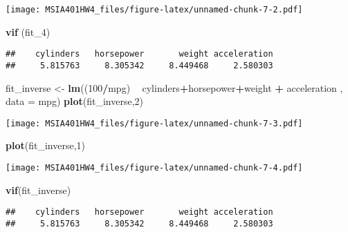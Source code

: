 \documentclass[
]{article}
\newenvironment{Shaded}{\begin{snugshade}}{\end{snugshade}}
\newcommand{\DataTypeTok}[1]{\textcolor[rgb]{0.13,0.29,0.53}{#1}}
\newcommand{\DecValTok}[1]{\textcolor[rgb]{0.00,0.00,0.81}{#1}}
\newcommand{\KeywordTok}[1]{\textcolor[rgb]{0.13,0.29,0.53}{\textbf{#1}}}
\newcommand{\NormalTok}[1]{#1}
\newcommand{\OperatorTok}[1]{\textcolor[rgb]{0.81,0.36,0.00}{\textbf{#1}}}
\newcommand{\StringTok}[1]{\textcolor[rgb]{0.31,0.60,0.02}{#1}}
\begin{document}
\texttt{[image: MSIA401HW4\_files/figure-latex/unnamed-chunk-7-2.pdf]}

\begin{Shaded}
\begin{Highlighting}[]
\KeywordTok{vif}\NormalTok{ (fit_}\DecValTok{4}\NormalTok{)}
\end{Highlighting}
\end{Shaded}

\begin{verbatim}
##    cylinders   horsepower       weight acceleration 
##     5.815763     8.305342     8.449468     2.580303
\end{verbatim}

\begin{Shaded}
\begin{Highlighting}[]
\NormalTok{fit_inverse <-}\StringTok{ }\KeywordTok{lm}\NormalTok{((}\DecValTok{100}\OperatorTok{/}\NormalTok{mpg) }\OperatorTok{~}\StringTok{ }\NormalTok{cylinders}\OperatorTok{+}\NormalTok{horsepower}\OperatorTok{+}\NormalTok{weight }\OperatorTok{+}\StringTok{ }\NormalTok{acceleration , }\DataTypeTok{data =}\NormalTok{ mpg)}
\KeywordTok{plot}\NormalTok{(fit_inverse,}\DecValTok{2}\NormalTok{)}
\end{Highlighting}
\end{Shaded}

\texttt{[image: MSIA401HW4\_files/figure-latex/unnamed-chunk-7-3.pdf]}

\begin{Shaded}
\begin{Highlighting}[]
\KeywordTok{plot}\NormalTok{(fit_inverse,}\DecValTok{1}\NormalTok{)}
\end{Highlighting}
\end{Shaded}

\texttt{[image: MSIA401HW4\_files/figure-latex/unnamed-chunk-7-4.pdf]}

\begin{Shaded}
\begin{Highlighting}[]
\KeywordTok{vif}\NormalTok{(fit_inverse)}
\end{Highlighting}
\end{Shaded}

\begin{verbatim}
##    cylinders   horsepower       weight acceleration 
##     5.815763     8.305342     8.449468     2.580303
\end{verbatim}
\end{document}
